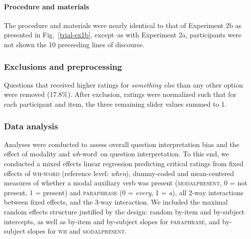 \documentclass[12pt,letterpaper,table,svgnames,dvipsnames]{article}
\newcommand{\figref}[1]{Fig.~\ref{#1}}
\newcommand{\whq}{\emph{wh}-question~}
\newcommand{\whw}{\emph{wh}-word~}
\begin{document}
\paragraph{Procedure and materials}
The procedure and materials were nearly identical to that of Experiment 2b as presented in \figref{trial-ex1b}, except--as with Experiment 2a, participants were not shown the 10 preceeding lines of discourse.


\subsubsection{Exclusions and preprocessing}
Questions that received higher ratings for \emph{something else} than any other option were removed (17.8\%). After exclusion, ratings were normalized such that for each participant and item, the three remaining slider values summed to 1.


\subsubsection{Data analysis}
Analyses were conducted to assess overall question interpretation bias and the effect of modality and \whw on question interpretation. To this end, we conducted a mixed effects linear regression predicting critical ratings from fixed effects of \textsc{wh-word} (reference level: \emph{when}), dummy-coded and mean-centered measures of whether a modal auxiliary verb was present (\textsc{modalpresent}, 0 = not present, 1 = present) and \textsc{paraphrase} (0 = \emph{every}, 1 = \emph{a}), all 2-way interactions between fixed effects, and the 3-way interaction. We included the maximal random effects structure justified by the design: random by-item and by-subject intercepts, as well as by-item and by-subject slopes for \textsc{paraphrase}, and by-subject slopes for \textsc{wh} and \textsc{modalpresent}. 
\end{document}
